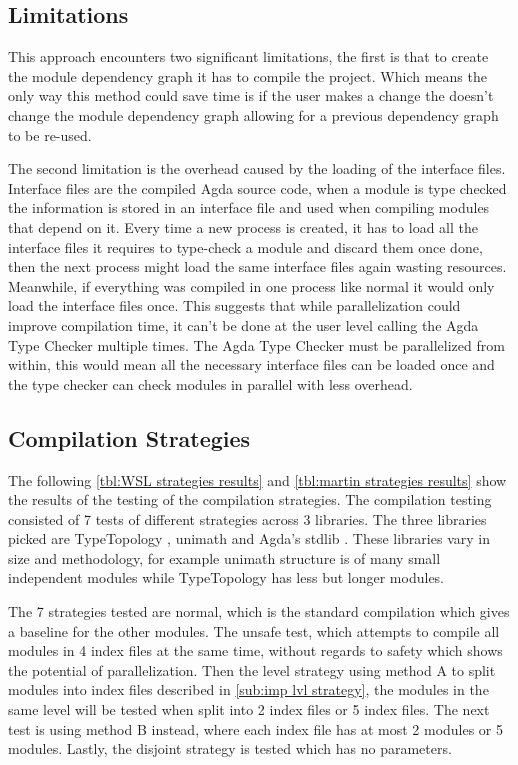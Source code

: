 \subsection{Limitations} \label{sub:eval comp limitations}

This approach encounters two significant limitations, the first is that to
create the module dependency graph it has to compile the project. Which means
the only way this method could save time is if the user makes a change the
doesn't change the module dependency graph allowing for a previous dependency
graph to be re-used.

The second limitation is the overhead caused by the loading of the interface
files. Interface files are the compiled Agda source code, when a module is type
checked the information is stored in an interface file and used when compiling
modules that depend on it. Every time a new process is created, it has to load
all the interface files it requires to type-check a module and discard them
once done, then the next process might load the same interface files again
wasting resources. Meanwhile, if everything was compiled in one process like
normal it would only load the interface files once. This suggests that while
parallelization could improve compilation time, it can't be done at the user
level calling the Agda Type Checker multiple times. The Agda Type Checker must
be parallelized from within, this would mean all the necessary interface files
can be loaded once and the type checker can check modules in parallel with less
overhead.

\subsection{Compilation Strategies} \label{sub:eval comp strat}

The following \cref{tbl:WSL strategies results} and \cref{tbl:martin
strategies results} show the results of the testing of the compilation
strategies. The compilation testing consisted of 7 tests of different
strategies across 3 libraries. The three libraries picked are TypeTopology
\cite{type-topology}, unimath \cite{agda-unimath} and Agda's stdlib
\cite{stdlib}. These libraries vary in size and methodology, for example
unimath structure is of many small independent modules while TypeTopology has
less but longer modules.

The 7 strategies tested are normal, which is the standard compilation which
gives a baseline for the other modules. The unsafe test, which attempts to
compile all modules in 4 index files at the same time, without regards to
safety which shows the potential of parallelization. Then the level strategy
using method A to split modules into index files described in 
\cref{sub:imp lvl strategy}, the modules in the same level will be tested when
split into 2 index files or 5 index files. The next test is using method B
instead, where each index file has at most 2 modules or 5 modules. Lastly, the
disjoint strategy is tested which has no parameters.

